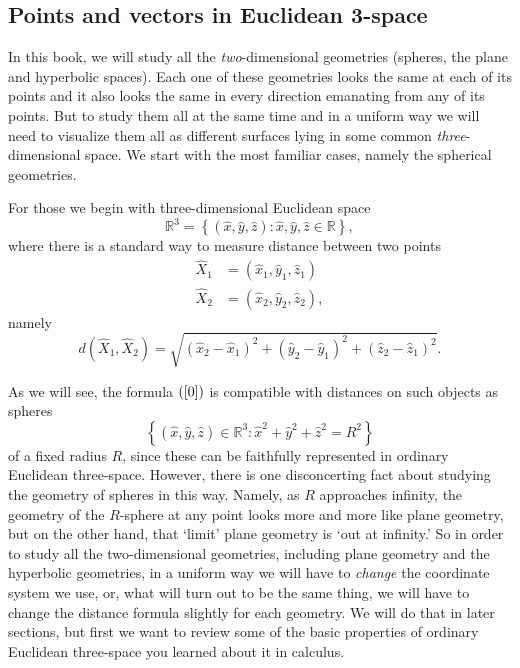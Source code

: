 
\subsection*{Points and vectors in Euclidean 3-space}

In this book, we will study all the \textit{two}-dimensional geometries
(spheres, the plane and hyperbolic spaces). Each one of these geometries looks
the same at each of its points and it also looks the same in every direction
emanating from any of its points. But to study them all at the same time and
in a uniform way we will need to visualize them all as different surfaces
lying in some common \textit{three}-dimensional space. We start with the most
familiar cases, namely the spherical geometries.

For those we begin with three-dimensional Euclidean space%
\[
\mathbb{R}^{3}=\left\{  \left(  \hat{x},\hat{y},\hat{z}\right)  :\hat{x}%
,\hat{y},\hat{z}\in\mathbb{R}\right\}  ,
\]
where there is a standard way to measure distance between two points%
\begin{align*}
\hat{X}_{1}  &  =\left(  \hat{x}_{1},\hat{y}_{1},\hat{z}_{1}\right) \\
\hat{X}_{2}  &  =\left(  \hat{x}_{2},\hat{y}_{2},\hat{z}_{2}\right)  ,
\end{align*}
namely%
\begin{equation}
d\left(  \hat{X}_{1},\hat{X}_{2}\right)  =\sqrt{\left(  \hat{x}_{2}-\hat
{x}_{1}\right)  ^{2}+\left(  \hat{y}_{2}-\hat{y}_{1}\right)  ^{2}+\left(
\hat{z}_{2}-\hat{z}_{1}\right)  ^{2}}. \label{0}%
\end{equation}


As we will see, the formula $\left(  \ref{0}\right)  $ is compatible with
distances on such objects as spheres%
\[
\left\{  \left(  \hat{x},\hat{y},\hat{z}\right)  \in\mathbb{R}^{3}:\hat{x}%
^{2}+\hat{y}^{2}+\hat{z}^{2}=R^{2}\right\}
\]
of a fixed radius $R$, since these can be faithfully represented in ordinary
Euclidean three-space. However, there is one disconcerting fact about studying
the geometry of spheres in this way. Namely, as $R$ approaches infinity, the
geometry of the $R$-sphere at any point looks more and more like plane
geometry, but on the other hand, that `limit' plane geometry is `out at
infinity.' So in order to study all the two-dimensional geometries, including
plane geometry and the hyperbolic geometries, in a uniform way we will have to
\textit{change} the coordinate system we use, or, what will turn out to be the
same thing, we will have to change the distance formula slightly for each
geometry. We will do that in later sections, but first we want to review some
of the basic properties of ordinary Euclidean three-space you learned about it
in calculus.

